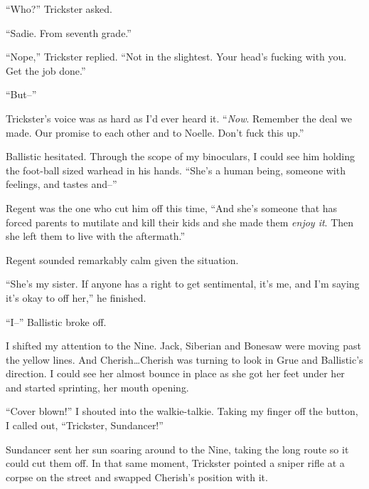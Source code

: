 ``Who?'' Trickster asked.



``Sadie.  From seventh grade.''



``Nope,'' Trickster replied.  ``Not in the slightest.  Your head's fucking with you.  Get the job done.''



``But--''



Trickster's voice was as hard as I'd ever heard it.  ``\emph{Now}.  Remember the deal we made.  Our promise to each other and to Noelle.  Don't fuck this up.''



Ballistic hesitated.  Through the scope of my binoculars, I could see him holding the foot-ball sized warhead in his hands.  ``She's a human being, someone with feelings, and tastes and--''



Regent was the one who cut him off this time, ``And she's someone that has forced parents to mutilate and kill their kids and she made them \emph{enjoy it}.  Then she left them to live with the aftermath.''



Regent sounded remarkably calm given the situation.



``She's my sister.  If anyone has a right to get sentimental, it's me, and I'm saying it's okay to off her,'' he finished.



``I--''  Ballistic broke off.



I shifted my attention to the Nine.  Jack, Siberian and Bonesaw were moving past the yellow lines.  And Cherish\ldots Cherish was turning to look in Grue and Ballistic's direction.  I could see her almost bounce in place as she got her feet under her and started sprinting, her mouth opening.



``Cover blown!'' I shouted into the walkie-talkie.  Taking my finger off the button, I called out,  ``Trickster, Sundancer!''



Sundancer sent her sun soaring around to the Nine, taking the long route so it could cut them off.  In that same moment, Trickster pointed a sniper rifle at a corpse on the street and swapped Cherish's position with it.



